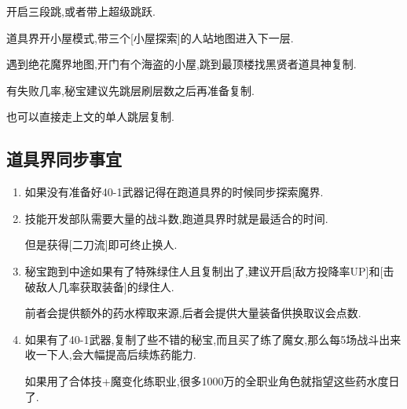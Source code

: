 	开启三段跳,或者带上超级跳跃.

	道具界开小屋模式,带三个[小屋探索]的人站地图进入下一层.

	遇到绝花魔界地图,开门有个海盗的小屋,跳到最顶楼找黑贤者道具神复制.

	有失败几率,秘宝建议先跳层刷层数之后再准备复制.

	也可以直接走上文的单人跳层复制.

	\subsection{道具界同步事宜}

	\begin{enumerate}
		\item
		如果没有准备好40-1武器记得在跑道具界的时候同步探索魔界.

		\item
		技能开发部队需要大量的战斗数,跑道具界时就是最适合的时间.

		但是获得[二刀流]即可终止换人.

		\item
		秘宝跑到中途如果有了特殊绿住人且复制出了,建议开启[敌方投降率UP]和[击破敌人几率获取装备]的绿住人.

		前者会提供额外的药水榨取来源,后者会提供大量装备供换取议会点数.

		\item
		如果有了40-1武器,复制了些不错的秘宝,而且买了练了魔女,那么每5场战斗出来收一下人,会大幅提高后续炼药能力.

		如果用了合体技+魔变化练职业,很多1000万的全职业角色就指望这些药水度日了.

	\end{enumerate}

